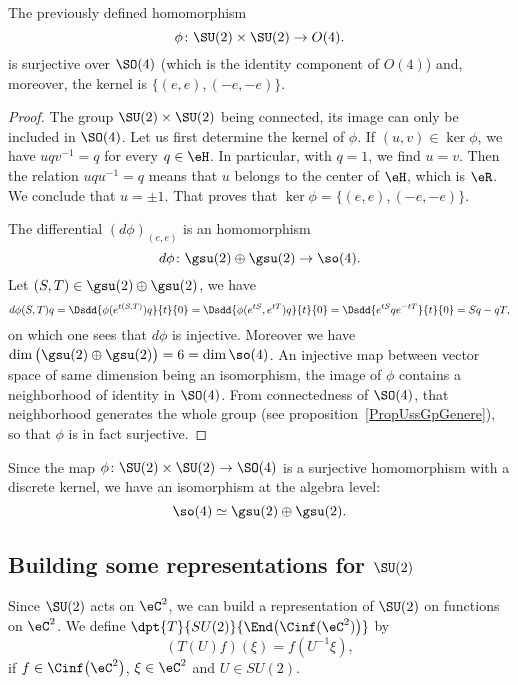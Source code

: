 \begin{proposition}
The previously defined homomorphism
\[
	\phi\colon \SU(2)\times\SU(2)\to O(4).
\]
is surjective over $\SO(4)$ (which is the identity component of $O(4)$) and, moreover, the kernel is $\big\{  (e,e),(-e,-e) \big\}$.
\end{proposition}

\begin{proof}
The group $\SU(2)\times \SU(2)$ being connected, its image can only be included in $\SO(4)$. Let us first determine the kernel of $\phi$. If $(u,v)\in\ker\phi$, we have $uqv^{-1}=q$ for every $q\in\eH$. In particular, with $q=1$, we find $u=v$. Then the relation $uqu^{-1}=q$ means that $u$ belongs to the center of $\eH$, which is $\eR$. We conclude that $u=\pm 1$. That proves that $\ker\phi=\big\{  (e,e),(-e,-e) \big\}$.

The differential $(d\phi)_{(e,e)}$ is an homomorphism
\[
	d\phi\colon \gsu(2)\oplus\gsu(2)\to \so(4).
\]
Let $(S,T)\in\gsu(2)\oplus\gsu(2)$, we have
\[
	d\phi(S,T)q=\Dsdd{ \phi( e^{t(S,T)})q }{t}{0}=\Dsdd{ \phi( e^{tS}, e^{tT})q }{t}{0}=\Dsdd{  e^{tS}q e^{-tT} }{t}{0}=Sq-qT,
\]
on which one sees that $d\phi$ is injective. Moreover we have $\dim\big( \gsu(2)\oplus\gsu(2) \big)=6=\dim\so(4)$. An injective map between vector space of same dimension being an isomorphism, the image of $\phi$ contains a neighborhood of identity in $\SO(4)$. From connectedness of $\SO(4)$, that neighborhood generates the whole group (see proposition~\ref{PropUssGpGenere}), so that $\phi$ is in fact surjective.
\end{proof}

Since the map $\phi\colon \SU(2)\times \SU(2)\to \SO(4)$ is a surjective homomorphism with a discrete kernel, we have an isomorphism at the algebra level:
\[
	\so(4)\simeq \gsu(2)\oplus\gsu(2).
\]

\subsection{Building some representations for \texorpdfstring{$\SU(2)$}{SU2}}

Since $\SU(2)$ acts on $\eC^2$, we can build a representation of $\SU(2)$ on functions on $\eC^2$. We define $\dpt{T}{SU(2)}{\End\big(\Cinf(\eC^2)\big)}$ by
\[
  (T(U)f)(\xi)=f(U^{-1}\xi),
\]
if $f\in\Cinf\big(\eC^2\big)$, $\xi\in\eC^2$ and $U\in SU(2)$.

